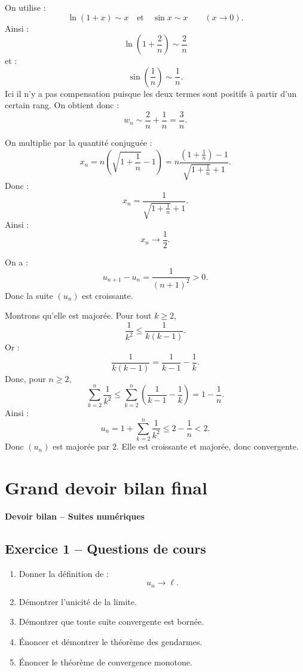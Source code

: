 \documentclass[11pt,a4paper]{article}
\begin{document}
\begin{correctionbox}[10]
On utilise :
\[
\ln(1+x)\sim x
\quad\text{et}\quad
\sin x\sim x
\qquad(x\to0).
\]
Ainsi :
\[
\ln\left(1+\frac2n\right)\sim\frac2n
\]
et :
\[
\sin\left(\frac1n\right)\sim\frac1n.
\]
Ici il n'y a pas compensation puisque les deux termes sont positifs à partir d'un certain rang. On obtient donc :
\[
w_n\sim\frac2n+\frac1n=\frac3n.
\]
\end{correctionbox}

\begin{correctionbox}[11]
On multiplie par la quantité conjuguée :
\[
x_n=n\left(\sqrt{1+\frac1n}-1\right)
=
n\frac{\left(1+\frac1n\right)-1}{\sqrt{1+\frac1n}+1}.
\]
Donc :
\[
x_n=
\frac{1}{\sqrt{1+\frac1n}+1}.
\]
Ainsi :
\[
x_n\to\frac12.
\]
\end{correctionbox}

\begin{correctionbox}[12]
On a :
\[
u_{n+1}-u_n=\frac1{(n+1)^2}>0.
\]
Donc la suite \((u_n)\) est croissante.

Montrons qu'elle est majorée. Pour tout \(k\geq2\),
\[
\frac1{k^2}\leq \frac1{k(k-1)}.
\]
Or :
\[
\frac1{k(k-1)}=\frac1{k-1}-\frac1k.
\]
Donc, pour \(n\geq2\),
\[
\sum_{k=2}^n\frac1{k^2}
\leq
\sum_{k=2}^n\left(\frac1{k-1}-\frac1k\right)
=
1-\frac1n.
\]
Ainsi :
\[
u_n
=
1+\sum_{k=2}^n\frac1{k^2}
\leq
2-\frac1n
<2.
\]
Donc \((u_n)\) est majorée par \(2\). Elle est croissante et majorée, donc convergente.
\end{correctionbox}

\newpage
\section{Grand devoir bilan final}

\begin{center}
\Large\textbf{Devoir bilan -- Suites numériques}
\end{center}

\subsection*{Exercice 1 -- Questions de cours}

\begin{enumerate}
    \item Donner la définition de :
    \[
    u_n\to\ell.
    \]
    \item Démontrer l'unicité de la limite.
    \item Démontrer que toute suite convergente est bornée.
    \item Énoncer et démontrer le théorème des gendarmes.
    \item Énoncer le théorème de convergence monotone.
\end{enumerate}
\end{document}
